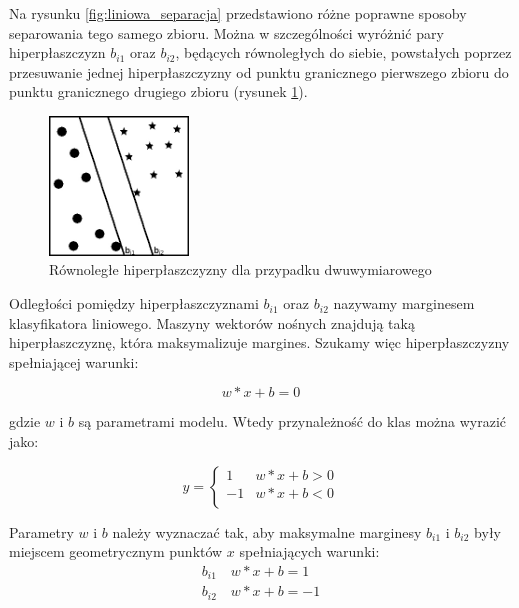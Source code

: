 Na rysunku \ref{fig:liniowa_separacja} przedstawiono różne poprawne sposoby separowania tego samego zbioru. Można w szczególności wyróżnić pary hiperpłaszczyzn $b_{i1}$ oraz $b_{i2}$, będących równoległych do 
siebie, powstałych poprzez przesuwanie jednej hiperpłaszczyzny od punktu granicznego pierwszego zbioru do punktu granicznego drugiego zbioru (rysunek \ref{fig:rownolegla_separacja}).
\newpage
\begin{figure}[h!]
    \centering
    \includegraphics[width=0.33\textwidth]{img/granica_rownolegla.jpg}
    \caption{Równoległe hiperpłaszczyzny dla przypadku dwuwymiarowego}
    \label{fig:rownolegla_separacja}
\end{figure}

Odległości pomiędzy hiperpłaszczyznami $b_{i1}$ oraz $b_{i2}$ nazywamy marginesem klasyfikatora liniowego. Maszyny wektorów nośnych znajdują taką hiperpłaszczyznę, która maksymalizuje margines. Szukamy więc hiperpłaszczyzny spełniającej warunki:

\begin{equation}
    w*x + b =0
\end{equation}

gdzie $w$ i $b$ są parametrami modelu. Wtedy przynależność do klas można wyrazić jako:

\begin{displaymath}
    y = \left\{ \begin{array}{ll}
        1 & \textrm{$w*x+b>0$}\\
        -1 & \textrm{$w*x+b<0$}\\
    \end{array} \right.
\end{displaymath}

Parametry $w$ i $b$ należy wyznaczać tak, aby maksymalne marginesy $b_{i1}$ i $b_{i2}$ były miejscem geometrycznym punktów $x$ spełniających warunki:
\begin{eqnarray}
    b_{i1} \quad w*x + b =1 \\
    b_{i2} \quad w*x + b =-1
\end{eqnarray}

